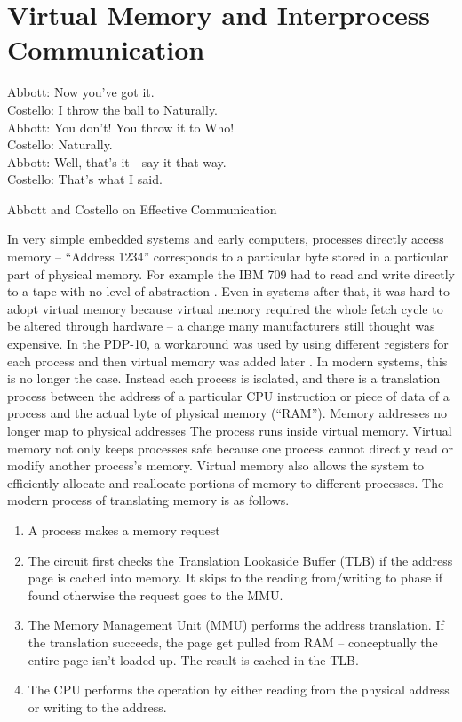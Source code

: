 \chapter{Virtual Memory and Interprocess Communication}

\epigraph{Abbott: Now you've got it. \\
Costello: I throw the ball to Naturally. \\
Abbott: You don't! You throw it to Who! \\
Costello: Naturally. \\
Abbott: Well, that's it - say it that way. \\
Costello: That's what I said.}{Abbott and Costello on Effective Communication}

In very simple embedded systems and early computers, processes directly access memory -- ``Address 1234'' corresponds to a particular byte stored in a particular part of physical memory.
For example the IBM 709 had to read and write directly to a tape with no level of abstraction \cite[P. 65]{ibm709}.
Even in systems after that, it was hard to adopt virtual memory because virtual memory required the whole fetch cycle to be altered through hardware -- a change many manufacturers still thought was expensive.
In the PDP-10, a workaround was used by using different registers for each process and then virtual memory was added later \cite{ricm}.
In modern systems, this is no longer the case.
Instead each process is isolated, and there is a translation process between the address of a particular CPU instruction or piece of data of a process and the actual byte of physical memory (``RAM'').
Memory addresses no longer map to physical addresses
The process runs inside virtual memory.
Virtual memory not only keeps processes safe because one process cannot directly read or modify another process's memory.
Virtual memory also allows the system to efficiently allocate and reallocate portions of memory to different processes.
The modern process of translating memory is as follows.

\begin{enumerate}
\item A process makes a memory request
\item The circuit first checks the Translation Lookaside Buffer (TLB) if the address page is cached into memory. It skips to the reading from/writing to phase if found otherwise the request goes to the MMU.
\item The Memory Management Unit (MMU) performs the address translation. If the translation succeeds, the page get pulled from RAM -- conceptually the entire page isn't loaded up. The result is cached in the TLB.
\item The CPU performs the operation by either reading from the physical address or writing to the address.
\end{enumerate}

